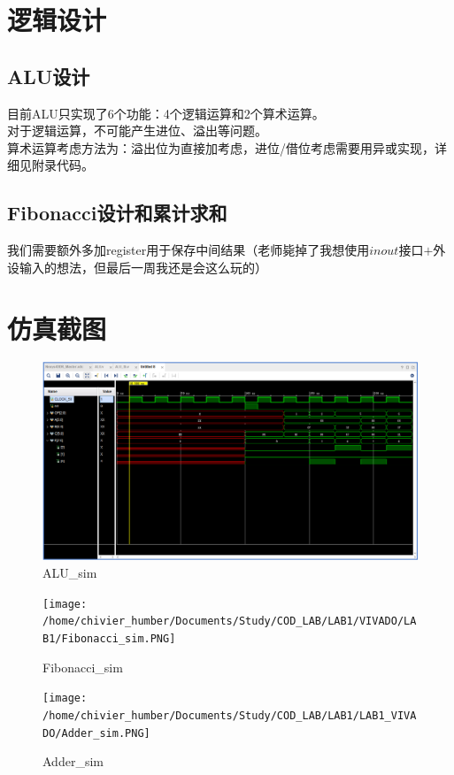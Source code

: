 \documentclass[12pt, a4paper]{article}
\begin{document}
\section{逻辑设计}
\subsection{ALU设计}
目前ALU只实现了6个功能：4个逻辑运算和2个算术运算。\\
对于逻辑运算，不可能产生进位、溢出等问题。\\
算术运算考虑方法为：溢出位为直接加考虑，进位/借位考虑需要用异或实现，详细见附录代码。
\subsection{Fibonacci设计和累计求和}
我们需要额外多加register用于保存中间结果（老师毙掉了我想使用$inout$接口$+$外设输入的想法，但最后一周我还是会这么玩的）\\

\section{仿真截图}
\begin{figure}[H]
	\centering
	\includegraphics[width=1.0\linewidth]{VIVADO/LAB1/lab1_alu_sim}
	\caption{ALU\_sim}
	\label{fig:lab1alusim}
\end{figure}
\begin{figure}[H]
\centering
\texttt{[image: /home/chivier\_humber/Documents/Study/COD\_LAB/LAB1/VIVADO/LAB1/Fibonacci\_sim.PNG]}
\caption{Fibonacci\_sim}
\label{fig:lab1alusim}
\end{figure}
\begin{figure}[H]
	\centering
	\texttt{[image: /home/chivier\_humber/Documents/Study/COD\_LAB/LAB1/LAB1\_VIVADO/Adder\_sim.PNG]}
	\caption{Adder\_sim}
	\label{fig:lab1alusim}
\end{figure}
\end{document}
